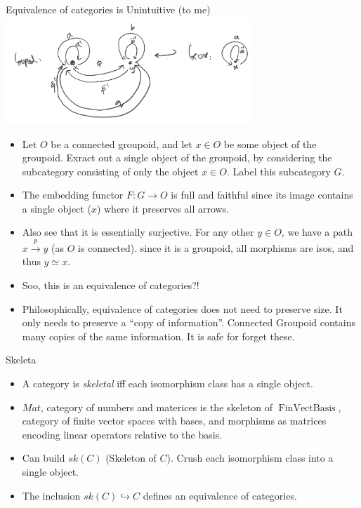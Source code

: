 \documentclass[8pt]{beamer}
\begin{document}
\begin{frame}{Equivalence of categories is Unintuitive (to me)}
    \includegraphics[width=0.7\textwidth]{./groupoid-to-group.png} \pause
    \begin{itemize}
        \item Let $O$ be a connected groupoid, and let $x \in O$ be some  object of the groupoid. Exract out a single object of the groupoid, by considering the subcategory
            consisting of only the object $x \in O$. Label this subcategory $G$. \pause
        \item The embedding functor $F: G \rightarrow O$ is full and faithful since its image contains a single object ($x$) where it preserves all arrows. \pause
        \item Also see that it is essentially surjective. \pause For any other $y \in O$, we have a path $x \xrightarrow{p} y$ (as $O$ is connected). \pause
            \pause since it is a groupoid, all morphisms are isos, and thus $y \simeq x$. \pause
        \item Soo, this is an equivalence of categories?! \pause
        \item Philosophically, equivalence of categories does not need to
            preserve size. \pause It only needs to preserve a ``copy of
            information''. \pause Connected Groupoid contains many copies of
            the same information. \pause It is safe for forget these. \pause
    \end{itemize}
\end{frame}


\begin{frame}{Skeleta}
    \begin{itemize}
        \item A category is \emph{skeletal} iff each isomorphism class has a
        single object.  \pause
    \item $Mat$, category of numbers and materices is the
            skeleton of $\operatorname{FinVectBasis}$, category of finite
            vector spaces with bases, and morphisms as matrices encoding linear
            operators relative to the basis.
        \item Can build $sk(C)$ (Skeleton of $C$). Crush each isomorphism class into a single object.
        \item The inclusion $sk(C) \hookrightarrow C$ defines an equivalence of categories.
    \end{itemize}
\end{frame}
\end{document}

